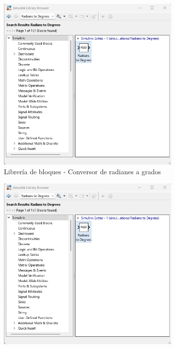 \begin{figure}[htbp]
    \centering
    \begin{subfigure}[b]{0.35\textwidth}
        \centering
        \includegraphics[width=\textwidth]{fig/Capitulo5/Caso_de_estudio_IMU/Generador_de_salidas/libreria_bloque__rad_2_deg.png}
        \caption{Librería de bloques - Conversor de radianes a grados}
        \label{fig:lib_bloques_R2D}
    \end{subfigure}
    \hfill
    \begin{subfigure}[b]{0.45\textwidth}
        \centering
        \includegraphics[width=\textwidth]{fig/Capitulo5/Caso_de_estudio_IMU//Generador_de_salidas/libreria_bloque__rad_2_deg.png}

\end{subfigure}
\end{figure}
